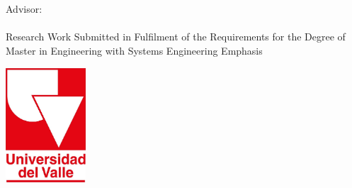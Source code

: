 
\begin{titlepage}

\begin{center}
\large

\hfill
\vfill

\begingroup
\color{Maroon}\spacedallcaps{\myTitle} \\  \bigskip %
\endgroup

\vfill
{} \\ %

\vfill
Advisor:\\ \medskip 
\spacedlowsmallcaps{\myAdvisor}\\ %
\vfill
Research Work Submitted in Fulfilment of the Requirements for the Degree of Master in Engineering with Systems Engineering Emphasis

\vfill

\includegraphics[width=3cm]{gfx/logoUV} \\ \medskip %

\myDepartment \\
\myFaculty \\
\myUni \\ \bigskip

\myTime %

\vfill

\end{center}

\end{titlepage}

